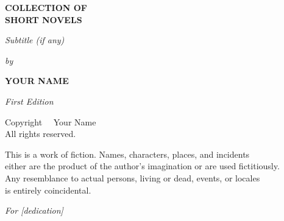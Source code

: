 \documentclass[11pt,oneside,openany]{memoir}
\begin{document}
\frontmatter

\begin{titlingpage}
    \begin{center}
        \vspace*{0.25\textheight}
        {\Large\bfseries\color{chaptercolor} COLLECTION OF\\SHORT NOVELS \par}
        \vspace{1cm}
        {\large\itshape Subtitle (if any) \par}
        
        \vspace{0.2\textheight}
        {\itshape by \par}
        \vspace{0.5cm}
        {\large\bfseries YOUR NAME \par}
    \end{center}
\end{titlingpage}

\clearpage
\thispagestyle{empty}
\vspace*{\fill}
\begin{center}
    \textit{First Edition}
    
    \vspace{1cm}
    Copyright \textcopyright\ \the\year\ Your Name\\
    All rights reserved.
    
    \vspace{1cm}
    \small
    This is a work of fiction. Names, characters, places, and incidents\\
    either are the product of the author's imagination or are used fictitiously.\\
    Any resemblance to actual persons, living or dead, events, or locales\\
    is entirely coincidental.
\end{center}
\vspace*{\fill}

\clearpage
\thispagestyle{empty}
\vspace*{\fill}
\begin{center}
    \textit{For [dedication]}
\end{center}
\vspace*{\fill}

\clearpage
\renewcommand{\contentsname}{CONTENTS}
\tableofcontents*
\end{document}
